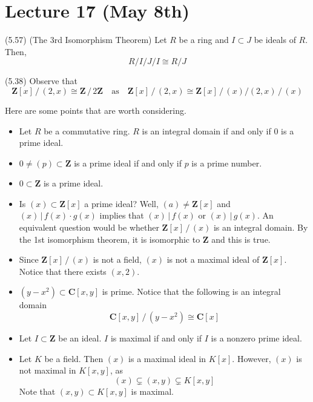 \section{Lecture 17 (May 8th)}
\begin{recall}
(5.57) (The 3rd Isomorphism Theorem) Let $R$ be a ring and $I\subset J$ be ideals of $R$. Then,
\[R/I\Big/ J/I\cong R/J\]
\end{recall}
\vspace{2ex}
\begin{ex}
(5.38) Observe that
\[{\bm Z}[x]\,/ \,(2,x)\cong {\bm Z}\,/\,2{\bm Z}\quad \mathrm{as}\quad{\bm Z}[x]\,/\,(2,x)\cong {\bm Z}[x]\,/\,(x)\Big/(2,x)\,/\,(x)\]
\end{ex}
\vspace{2ex}
\begin{ex}
Here are some points that are worth considering.
\begin{itemize}
\item[(1)] Let $R$ be a commutative ring. $R$ is an integral domain if and only if 0 is a prime ideal. 
\item[(2-1)] $0\ne (p)\subset {\bm Z}$ is a prime ideal if and only if $p$ is a prime number.
\item[(2-2)] $0\subset {\bm Z}$ is a prime ideal.
\item[(3-1)] Is $(x)\subset {\bm Z}[x]$ a prime ideal? Well, $(a)\ne {\bm Z}[x]$ and $(x)\,|\,f(x)\cdot g(x)$ implies that $(x)\,|\,f(x)$ or $(x)\,|\,g(x)$. An equivalent question would be whether ${\bm Z}[x]\,/\,(x)$ is an integral domain. By the 1st isomorphism theorem, it is isomorphic to ${\bm Z}$ and this is true.
\item[(3-2)] Since ${\bm Z}[x]\,/\,(x)$ is not a field, $(x)$ is not a maximal ideal of ${\bm Z}[x]$. Notice that there exists $(x,2)$.
\item[(4)] $(y-x^2)\subset {\bm C}[x,y]$ is prime. Notice that the following is an integral domain
\[{\bm C}[x,y]\,/\,(y-x^2)\cong {\bm C}[x]\]
\item[(5)] Let $I\subset {\bm Z}$ be an ideal. $I$ is maximal if and only if $I$ is a nonzero prime ideal.
\item[(6)] Let $K$ be a field. Then $(x)$ is a maximal ideal in $K[x]$. However, $(x)$ is not maximal in $K[x,y]$, as 
\[(x)\subsetneq (x,y)\subsetneq K[x,y] \]
Note that $(x,y)\subset K[x,y]$ is maximal.
\end{itemize}
\end{ex}
\vspace{2ex}

